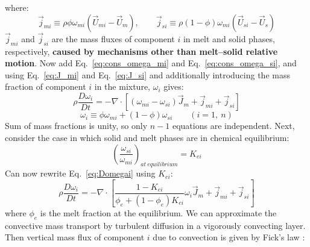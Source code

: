 where:
\begin{equation}
\vec{j}_{mi} \equiv \rho \phi \omega_{mi} ( \vec{U}_{mi}-\vec{U}_m ), \qquad \vec{j}_{si} \equiv \rho (1-\phi) \omega_{mi} (\vec{U}_{si}-\vec{U}_s)
\end{equation}
$\vec{j}_{mi}$ and $\vec{j}_{si}$ are the mass fluxes of component $i$ in melt and solid phases, respectively, \textbf{caused by mechanisms other than melt--solid relative motion}.  Now add Eq.~\ref{eq:cons_omega_mi} and Eq.~\ref{eq:cons_omega_si}, and using Eq.~\ref{eq:J_mi} and Eq.~\ref{eq:J_si} and additionally introducing the mass fraction of component $i$ in the mixture, $\omega_i$ gives: 
\begin{equation}
\rho \frac{D\omega_i}{Dt} = -\nabla \cdot \left[ (\omega_{mi}-\omega_{si}) \vec{J}_m + \vec{j}_{mi} + \vec{j}_{si} \right]
\label{eq:Domegai}
\end{equation}
\begin{equation}
\omega_i \equiv \phi \omega_{mi} + (1-\phi) \omega_{si} \qquad (i=1,\ n)
\end{equation}
Sum of mass fractions is unity, so only $n-1$ equations are independent.  Next, consider the case in which solid and melt phases are in chemical equilibrium:
\begin{equation}
\left( \frac{\omega_{si}}{\omega_{mi}} \right)_{at\ equilibrium} = K_{ei}
\end{equation}
Can now rewrite Eq.~\ref{eq:Domegai} using $K_{ei}$:
\begin{equation}
\rho \frac{D \omega_i}{D t} = - \nabla \cdot \left[ \frac{1-K_{ei}}{\phi_e+(1-\phi_e)K_{ei}} \omega_i \vec{J}_{m} + \vec{j}_{mi} + \vec{j}_{si} \right]
\label{eq:Domegai2}
\end{equation}
where $\phi_e$ is the melt fraction at the equilibrium.  We can approximate the convective mass transport by turbulent diffusion in a vigorously convecting layer.  Then vertical mass flux of component $i$ due to convection is given by Fick's law :
